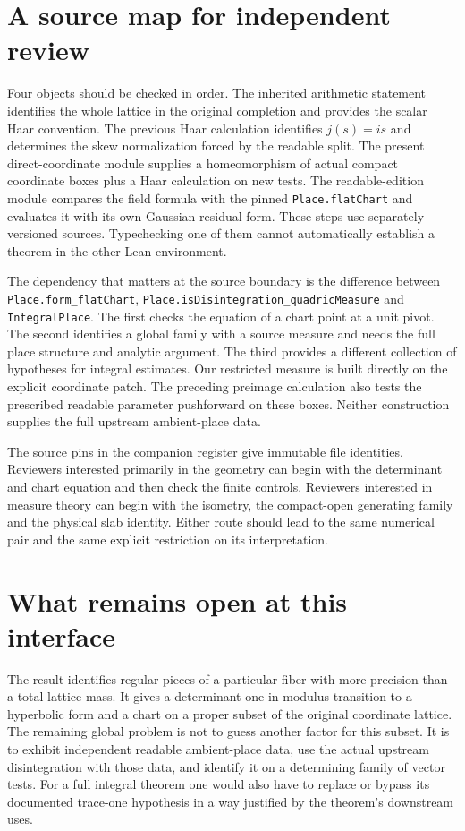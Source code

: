 \documentclass[12pt,letterpaper]{article}
\newcommand{\id}[1]{{\small\nolinkurl{#1}}}
\begin{document}
\section{A source map for independent review}
Four objects should be checked in order. The inherited arithmetic statement identifies the whole lattice in the original completion and provides the scalar Haar convention. The previous Haar calculation identifies $j(s)=is$ and determines the skew normalization forced by the readable split. The present direct-coordinate module supplies a homeomorphism of actual compact coordinate boxes plus a Haar calculation on new tests. The readable-edition module compares the field formula with the pinned \id{Place.flatChart} and evaluates it with its own Gaussian residual form. These steps use separately versioned sources. Typechecking one of them cannot automatically establish a theorem in the other Lean environment.

The dependency that matters at the source boundary is the difference between \id{Place.form_flatChart}, \id{Place.isDisintegration_quadricMeasure} and \id{IntegralPlace}. The first checks the equation of a chart point at a unit pivot. The second identifies a global family with a source measure and needs the full place structure and analytic argument. The third provides a different collection of hypotheses for integral estimates. Our restricted measure is built directly on the explicit coordinate patch. The preceding preimage calculation also tests the prescribed readable parameter pushforward on these boxes. Neither construction supplies the full upstream ambient-place data.

The source pins in the companion register give immutable file identities. Reviewers interested primarily in the geometry can begin with the determinant and chart equation and then check the finite controls. Reviewers interested in measure theory can begin with the isometry, the compact-open generating family and the physical slab identity. Either route should lead to the same numerical pair and the same explicit restriction on its interpretation.

\section{What remains open at this interface}
The result identifies regular pieces of a particular fiber with more precision than a total lattice mass. It gives a determinant-one-in-modulus transition to a hyperbolic form and a chart on a proper subset of the original coordinate lattice. The remaining global problem is not to guess another factor for this subset. It is to exhibit independent readable ambient-place data, use the actual upstream disintegration with those data, and identify it on a determining family of vector tests. For a full integral theorem one would also have to replace or bypass its documented trace-one hypothesis in a way justified by the theorem's downstream uses.
\end{document}
